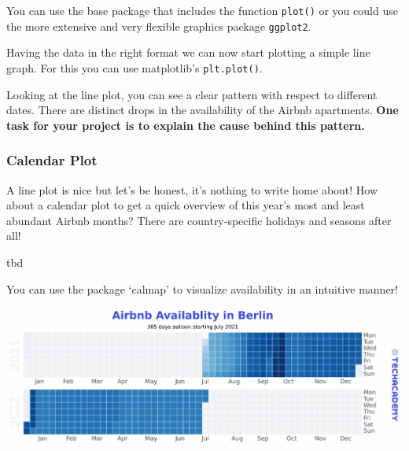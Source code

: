 \documentclass[
  11pt,
]{article}
\newenvironment{tips}[1]
  {
  \begin{itemize}
  \footnotesize
  \renewcommand{\labelitemi}{
    \raisebox{-.7\height}[0pt][0pt]{
      {\setkeys{Gin}{width=3em,keepaspectratio}
        \texttt{[image: images/\#1.png]}}
    }
  }
  \setlength{\fboxsep}{1em}
  \begin{rbox}
  \item
  }
  {
  \end{rbox}
  \end{itemize}
  }
\newenvironment{tipsp}[1]
  {
  \begin{itemize}
  \footnotesize
  \renewcommand{\labelitemi}{
    \raisebox{-.7\height}[0pt][0pt]{
      {\setkeys{Gin}{width=3em,keepaspectratio}
        \texttt{[image: images/\#1.png]}}
    }
  }
  \setlength{\fboxsep}{1em}
  \begin{pbox}
  \item
  }
  {
  \end{pbox}
  \end{itemize}
  }
\begin{document}
\begin{tips}r
You can use the base package that includes the function \texttt{plot()} or you could use the more extensive and very flexible graphics package \texttt{ggplot2}.

\end{tips}

\begin{tipsp}p
Having the data in the right format we can now start plotting a simple line graph. For this you can use matplotlib's \texttt{plt.plot()}.

\end{tipsp}

Looking at the line plot, you can see a clear pattern with respect to different dates. There are distinct drops in the availability of the Airbnb apartments. \textbf{One task for your project is to explain the cause behind this pattern.}

\hypertarget{calendar-plot}{%
\subsubsection{Calendar Plot}\label{calendar-plot}}

A line plot is nice but let's be honest, it's nothing to write home about! How about a calendar plot to get a quick overview of this year's most and least abundant Airbnb months?
There are country-specific holidays and seasons after all!

\begin{tips}r
tbd

\end{tips}

\begin{tipsp}p
You can use the package `calmap' to visualize availability in an intuitive manner!

\end{tipsp}

\begin{center}\includegraphics[width=1\linewidth]{plot/01_python/calendar} \end{center}
\end{document}
